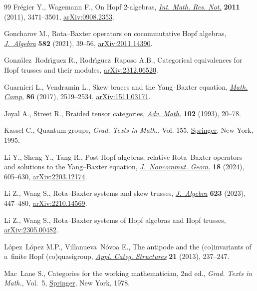 \documentclass[pdftex]{sigma}
\numberwithin{equation}{section}
\begin{document}
\begin{thebibliography}{99}
Fr\'egier Y., Wagemann F., On {H}opf 2-algebras, \href{https://doi.org/10.1093/imrn/rnq224}{\textit{Int. Math. Res. Not.}}
 \textbf{2011} (2011), 3471--3501, \href{https://arxiv.org/abs/0908.2353}{arXiv:0908.2353}.

Goncharov M., Rota--{B}axter operators on cocommutative {H}opf algebras,
 \href{https://doi.org/10.1016/j.jalgebra.2021.04.024}{\textit{J.~Algebra}} \textbf{582} (2021), 39--56, \href{https://arxiv.org/abs/2011.14390}{arXiv:2011.14390}.

Gonz\'alez~Rodr\'{\i}guez R., Rodr\'{\i}guez~Raposo A.B., Categorical
 equivalences for Hopf trusses and their modules, \href{https://arxiv.org/abs/2312.06520}{arXiv:2312.06520}.

Guarnieri L., Vendramin L., Skew braces and the {Y}ang--{B}axter equation,
 \href{https://doi.org/10.1090/mcom/3161}{\textit{Math. Comp.}} \textbf{86} (2017), 2519--2534, \href{https://arxiv.org/abs/1511.03171}{arXiv:1511.03171}.

Joyal A., Street R., Braided tensor categories, \href{https://doi.org/10.1006/aima.1993.1055}{\textit{Adv. Math.}}
 \textbf{102} (1993), 20--78.

Kassel C., Quantum groups, \textit{Grad. Texts in Math.}, Vol. 155, \href{https://doi.org/10.1007/978-1-4612-0783-2}{Springer},
 New York, 1995.

Li Y., Sheng Y., Tang R., Post-{H}opf algebras, relative {R}ota--{B}axter
 operators and solutions to the {Y}ang--{B}axter equation,
 \href{https://doi.org/10.4171/jncg/537}{\textit{J.~Noncommut. Geom.}} \textbf{18} (2024), 605--630,
 \href{https://arxiv.org/abs/2203.12174}{arXiv:2203.12174}.

Li Z., Wang S., Rota--{B}axter systems and skew trusses, \href{https://doi.org/10.1016/j.jalgebra.2023.02.022}{\textit{J.~Algebra}}
 \textbf{623} (2023), 447--480, \href{https://arxiv.org/abs/2210.14569}{arXiv:2210.14569}.

Li Z., Wang S., {R}ota--{B}axter systems of {H}opf algebras and {H}opf trusses,
 \href{https://arxiv.org/abs/2305.00482}{arXiv:2305.00482}.

L\'opez~L\'opez M.P., Villanueva~N\'ovoa E., The antipode and the
 (co)invariants of a~finite {H}opf (co)quasigroup, \href{https://doi.org/10.1007/s10485-011-9260-5}{\textit{Appl. Categ.
 Structures}} \textbf{21} (2013), 237--247.

Mac~Lane S., Categories for the working mathematician, 2nd ed., \textit{Grad. Texts in
 Math.}, Vol.~5, \href{https://doi.org/10.1007/978-1-4757-4721-8}{Springer}, New York, 1978.


\end{thebibliography}
\end{document}
